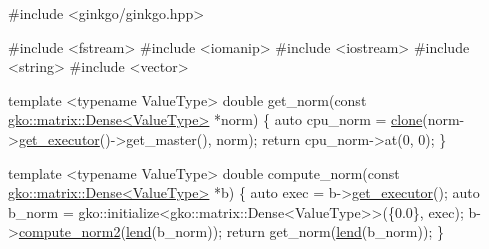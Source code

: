 \begin{DoxyCodeInclude}
\textcolor{preprocessor}{#include <ginkgo/ginkgo.hpp>}

\textcolor{preprocessor}{#include <fstream>}
\textcolor{preprocessor}{#include <iomanip>}
\textcolor{preprocessor}{#include <iostream>}
\textcolor{preprocessor}{#include <string>}
\textcolor{preprocessor}{#include <vector>}

\textcolor{keyword}{template} <\textcolor{keyword}{typename} ValueType>
\textcolor{keywordtype}{double} get\_norm(\textcolor{keyword}{const} \hyperlink{classgko_1_1matrix_1_1Dense}{gko::matrix::Dense<ValueType>} *norm)
\{
    \textcolor{keyword}{auto} cpu\_norm = \hyperlink{namespacegko_a1beb80750459e4201aa9d882d2d074c3}{clone}(norm->\hyperlink{classgko_1_1PolymorphicObject_ab40586bff071b7f11c2cf6b5cbf598eb}{get\_executor}()->get\_master(), norm);
    \textcolor{keywordflow}{return} cpu\_norm->at(0, 0);
\}

\textcolor{keyword}{template} <\textcolor{keyword}{typename} ValueType>
\textcolor{keywordtype}{double} compute\_norm(\textcolor{keyword}{const} \hyperlink{classgko_1_1matrix_1_1Dense}{gko::matrix::Dense<ValueType>} *b)
\{
    \textcolor{keyword}{auto} exec = b->\hyperlink{classgko_1_1PolymorphicObject_ab40586bff071b7f11c2cf6b5cbf598eb}{get\_executor}();
    \textcolor{keyword}{auto} b\_norm = gko::initialize<gko::matrix::Dense<ValueType>>(\{0.0\}, exec);
    b->\hyperlink{classgko_1_1matrix_1_1Dense_a97fd354c4a26814586cd256b5f0d7bea}{compute\_norm2}(\hyperlink{namespacegko_aa8cb4876b72e5e1036ea9575443c439b}{lend}(b\_norm));
    \textcolor{keywordflow}{return} get\_norm(\hyperlink{namespacegko_aa8cb4876b72e5e1036ea9575443c439b}{lend}(b\_norm));
\}


\end{DoxyCodeInclude}

